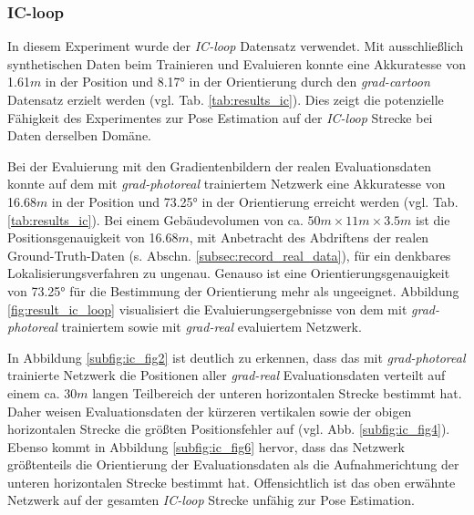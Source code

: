 \subsubsection{IC-loop}

In diesem Experiment wurde der \textit{IC-loop} Datensatz verwendet. 
Mit ausschließlich synthetischen Daten beim Trainieren und Evaluieren konnte eine Akkuratesse von 1.61$m$ in der Position und 8.17° in der Orientierung durch den \textit{grad-cartoon} Datensatz erzielt werden (vgl. Tab. \ref{tab:results_ic}). Dies zeigt die potenzielle Fähigkeit des Experimentes zur Pose Estimation auf der \textit{IC-loop} Strecke bei Daten derselben Domäne. 

Bei der Evaluierung mit den Gradientenbildern der realen Evaluationsdaten konnte auf dem mit \textit{grad-photoreal} trainiertem Netzwerk eine Akkuratesse von 16.68$m$ in der Position und 73.25° in der Orientierung erreicht werden (vgl. Tab. \ref{tab:results_ic}). Bei einem Gebäudevolumen von ca. $50m \times 11m \times 3.5m$ ist die Positionsgenauigkeit von 16.68$m$, mit Anbetracht des Abdriftens der realen Ground-Truth-Daten (s. Abschn. \ref{subsec:record_real_data}), für ein denkbares Lokalisierungsverfahren zu ungenau. Genauso ist eine Orientierungsgenauigkeit von 73.25° für die Bestimmung der Orientierung mehr als ungeeignet. Abbildung \ref{fig:result_ic_loop} visualisiert die Evaluierungsergebnisse von dem mit \textit{grad-photoreal} trainiertem sowie mit \textit{grad-real} evaluiertem Netzwerk.

In Abbildung \ref{subfig:ic_fig2} ist deutlich zu erkennen, dass das mit \textit{grad-photoreal} trainierte Netzwerk die Positionen aller \textit{grad-real} Evaluationsdaten verteilt auf einem ca. 30$m$ langen Teilbereich der unteren horizontalen Strecke bestimmt hat. Daher weisen Evaluationsdaten der kürzeren vertikalen sowie der obigen horizontalen Strecke die größten Positionsfehler auf (vgl. Abb. \ref{subfig:ic_fig4}). Ebenso kommt in Abbildung \ref{subfig:ic_fig6} hervor, dass das Netzwerk größtenteils die Orientierung der Evaluationsdaten als die Aufnahmerichtung der unteren horizontalen Strecke bestimmt hat. Offensichtlich ist das oben erwähnte Netzwerk auf der gesamten \textit{IC-loop} Strecke unfähig zur Pose Estimation.

